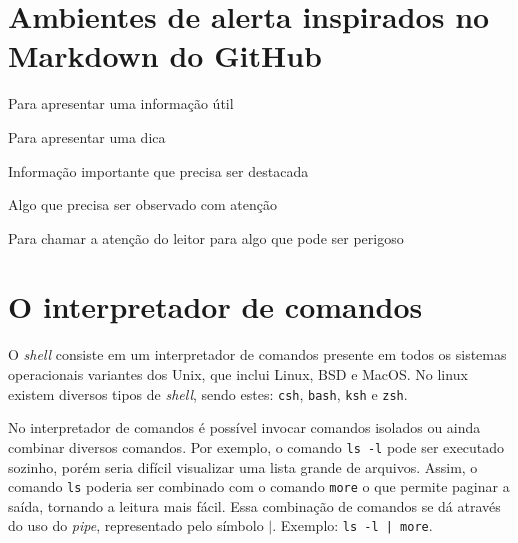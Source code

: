 \documentclass[11pt]{../classes/ifscarticle}
\begin{document}

\shell


\section{Ambientes de alerta inspirados no Markdown do GitHub}

\begin{note}[Nota][\faInfoCircle][notecolor]
	Para apresentar uma informação útil
\end{note}

\begin{tip}
	Para apresentar uma dica
\end{tip}

\begin{important}
	Informação importante que precisa ser destacada
\end{important}

\begin{warning}
	Algo que precisa ser observado com atenção
\end{warning}

\begin{caution}
	Para chamar a atenção do leitor para algo que pode ser perigoso
\end{caution}


\section{O interpretador de comandos}

O \textit{shell} consiste em um interpretador de comandos presente em todos os sistemas operacionais variantes dos Unix, que inclui Linux, BSD e MacOS. No linux existem diversos tipos de \textit{shell}, sendo estes: \texttt{csh}, \texttt{bash}, \texttt{ksh} e \texttt{zsh}. 

No interpretador de comandos é possível invocar comandos isolados ou ainda combinar diversos comandos. Por exemplo, o comando \texttt{ls -l} pode ser executado sozinho, porém seria difícil visualizar uma lista grande de arquivos. Assim, o comando \texttt{ls} poderia ser combinado com o comando \texttt{more} o que permite paginar a saída, tornando a leitura mais fácil. Essa combinação de comandos se dá através do uso do \textit{pipe}, representado pelo símbolo $|$. Exemplo: \texttt{ls -l | more}.
\end{document}
